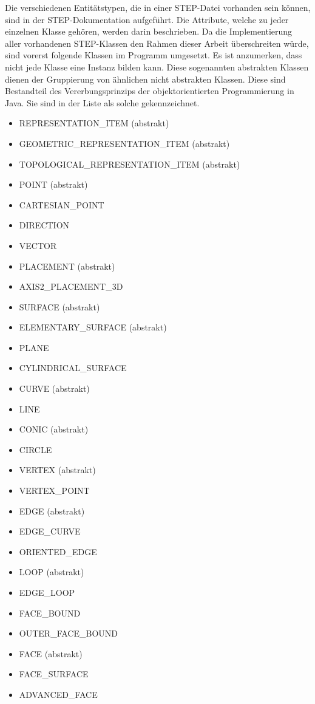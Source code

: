 Die verschiedenen Entitätstypen, die in einer STEP-Datei vorhanden sein können, sind in der STEP-Dokumentation \cite{StepDoc} aufgeführt. Die Attribute, welche zu jeder einzelnen Klasse gehören, werden darin beschrieben.
Da die Implementierung aller vorhandenen STEP-Klassen den Rahmen dieser Arbeit überschreiten würde, sind vorerst folgende Klassen im Programm umgesetzt. Es ist anzumerken, dass nicht jede Klasse eine Instanz bilden kann. Diese sogenannten abstrakten Klassen dienen der Gruppierung von ähnlichen nicht abstrakten Klassen. Diese sind Bestandteil des Vererbungsprinzips der objektorientierten Programmierung in Java. Sie sind in der Liste als solche gekennzeichnet.  
\begin{itemize}
	\item REPRESENTATION\_ITEM (abstrakt)
	\item GEOMETRIC\_REPRESENTATION\_ITEM (abstrakt)
	\item TOPOLOGICAL\_REPRESENTATION\_ITEM (abstrakt)
	\item POINT (abstrakt)
	\item CARTESIAN\_POINT
	\item DIRECTION
	\item VECTOR
	\item PLACEMENT (abstrakt)
	\item AXIS2\_PLACEMENT\_3D
	\item SURFACE (abstrakt)
	\item ELEMENTARY\_SURFACE (abstrakt)
	\item PLANE
	\item CYLINDRICAL\_SURFACE	
	\item CURVE (abstrakt)
	\item LINE
	\item CONIC (abstrakt)
	\item CIRCLE 
	\item VERTEX (abstrakt)
	\item VERTEX\_POINT
	\item EDGE (abstrakt)
	\item EDGE\_CURVE
	\item ORIENTED\_EDGE
	\item LOOP (abstrakt)
	\item EDGE\_LOOP
	\item FACE\_BOUND
	\item OUTER\_FACE\_BOUND
	\item FACE (abstrakt)
	\item FACE\_SURFACE
	\item ADVANCED\_FACE
\end{itemize}

